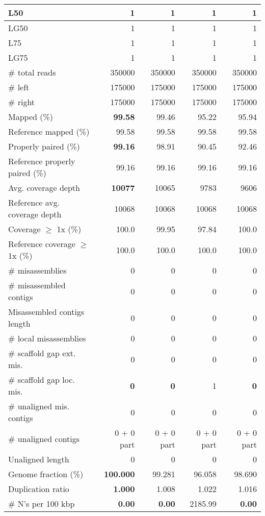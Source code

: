 \documentclass[12pt,a4paper]{article}
\begin{document}
\begin{table}[ht]
\begin{center}
\begin{tabular}{|l*{4}{|r}|}
L50 & 1 & 1 & 1 & 1 \\ \hline
LG50 & 1 & 1 & 1 & 1 \\ \hline
L75 & 1 & 1 & 1 & 1 \\ \hline
LG75 & 1 & 1 & 1 & 1 \\ \hline
\# total reads & 350000 & 350000 & 350000 & 350000 \\ \hline
\# left & 175000 & 175000 & 175000 & 175000 \\ \hline
\# right & 175000 & 175000 & 175000 & 175000 \\ \hline
Mapped (\%) & {\bf 99.58} & 99.46 & 95.22 & 95.94 \\ \hline
Reference mapped (\%) & 99.58 & 99.58 & 99.58 & 99.58 \\ \hline
Properly paired (\%) & {\bf 99.16} & 98.91 & 90.45 & 92.46 \\ \hline
Reference properly paired (\%) & 99.16 & 99.16 & 99.16 & 99.16 \\ \hline
Avg. coverage depth & {\bf 10077} & 10065 & 9783 & 9606 \\ \hline
Reference avg. coverage depth & 10068 & 10068 & 10068 & 10068 \\ \hline
Coverage $\geq$ 1x (\%) & 100.0 & 99.95 & 97.84 & 100.0 \\ \hline
Reference coverage $\geq$ 1x (\%) & 100.0 & 100.0 & 100.0 & 100.0 \\ \hline
\# misassemblies & 0 & 0 & 0 & 0 \\ \hline
\# misassembled contigs & 0 & 0 & 0 & 0 \\ \hline
Misassembled contigs length & 0 & 0 & 0 & 0 \\ \hline
\# local misassemblies & 0 & 0 & 0 & 0 \\ \hline
\# scaffold gap ext. mis. & 0 & 0 & 0 & 0 \\ \hline
\# scaffold gap loc. mis. & {\bf 0} & {\bf 0} & 1 & {\bf 0} \\ \hline
\# unaligned mis. contigs & 0 & 0 & 0 & 0 \\ \hline
\# unaligned contigs & 0 + 0 part & 0 + 0 part & 0 + 0 part & 0 + 0 part \\ \hline
Unaligned length & 0 & 0 & 0 & 0 \\ \hline
Genome fraction (\%) & {\bf 100.000} & 99.281 & 96.058 & 98.690 \\ \hline
Duplication ratio & {\bf 1.000} & 1.008 & 1.022 & 1.016 \\ \hline
\# N's per 100 kbp & {\bf 0.00} & {\bf 0.00} & 2185.99 & {\bf 0.00} \\ \hline

\end{tabular}
\end{center}
\end{table}
\end{document}
